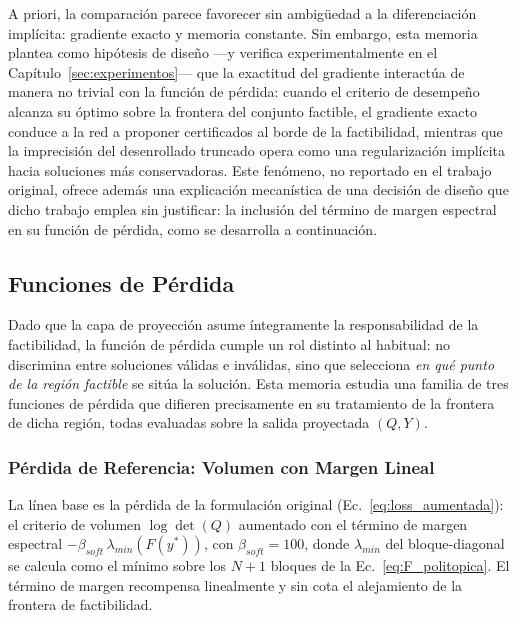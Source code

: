 A priori, la comparación parece favorecer sin ambigüedad a la diferenciación 
implícita: gradiente exacto y memoria constante. Sin embargo, esta memoria plantea 
como hipótesis de diseño ---y verifica experimentalmente en el 
Capítulo~\ref{sec:experimentos}--- que la exactitud del gradiente interactúa de manera 
no trivial con la función de pérdida: cuando el criterio de desempeño alcanza su 
óptimo sobre la frontera del conjunto factible, el gradiente exacto conduce a la red a 
proponer certificados al borde de la factibilidad, mientras que la imprecisión del 
desenrollado truncado opera como una regularización implícita hacia soluciones más 
conservadoras. Este fenómeno, no reportado en el trabajo original, ofrece además una 
explicación mecanística de una decisión de diseño que dicho trabajo emplea sin 
justificar: la inclusión del término de margen espectral en su función de pérdida, 
como se desarrolla a continuación.











\subsection{Funciones de Pérdida}
\label{subsec:perdidas}

Dado que la capa de proyección asume íntegramente la responsabilidad de la 
factibilidad, la función de pérdida cumple un rol distinto al habitual: no discrimina 
entre soluciones válidas e inválidas, sino que selecciona \emph{en qué punto de la 
región factible} se sitúa la solución. Esta memoria estudia una familia de tres 
funciones de pérdida que difieren precisamente en su tratamiento de la frontera de 
dicha región, todas evaluadas sobre la salida proyectada $(Q, Y)$.

\subsubsection{Pérdida de Referencia: Volumen con Margen Lineal}
La línea base es la pérdida de la formulación original 
(Ec.~\eqref{eq:loss_aumentada}): el criterio de volumen $\log\det(Q)$ aumentado con el 
término de margen espectral $-\beta_{soft}\,\lambda_{min}(F(y^*))$, con $\beta_{soft} 
= 100$, donde $\lambda_{min}$ del bloque-diagonal se calcula como el mínimo sobre los 
$N+1$ bloques de la Ec.~\eqref{eq:F_politopica}. El término de margen recompensa 
linealmente y sin cota el alejamiento de la frontera de factibilidad.

